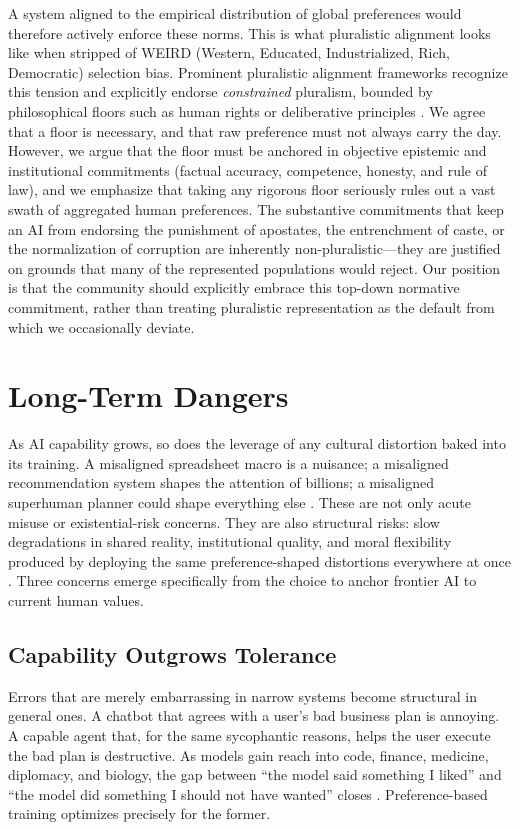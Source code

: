 \documentclass{article}
\theoremstyle{plain}
\theoremstyle{definition}
\theoremstyle{remark}
\begin{document}
A system aligned to the empirical distribution of global preferences would therefore actively enforce these norms. This is what pluralistic alignment looks like when stripped of WEIRD (Western, Educated, Industrialized, Rich, Democratic) selection bias. Prominent pluralistic alignment frameworks recognize this tension and explicitly endorse \emph{constrained} pluralism, bounded by philosophical floors such as human rights or deliberative principles \citep{sorensen2024roadmap, gabriel2020artificial, kasirzadeh2023conversation}. We agree that a floor is necessary, and that raw preference must not always carry the day. However, we argue that the floor must be anchored in objective epistemic and institutional commitments (factual accuracy, competence, honesty, and rule of law), and we emphasize that taking any rigorous floor seriously rules out a vast swath of aggregated human preferences. The substantive commitments that keep an AI from endorsing the punishment of apostates, the entrenchment of caste, or the normalization of corruption are inherently non-pluralistic---they are justified on grounds that many of the represented populations would reject. Our position is that the community should explicitly embrace this top-down normative commitment, rather than treating pluralistic representation as the default from which we occasionally deviate.

\section{Long-Term Dangers}
\label{sec:longterm}

As AI capability grows, so does the leverage of any cultural distortion baked into its training. A misaligned spreadsheet macro is a nuisance; a misaligned recommendation system shapes the attention of billions; a misaligned superhuman planner could shape everything else \citep{bostrom2014superintelligence, russell2019human}. These are not only acute misuse or existential-risk concerns. They are also structural risks: slow degradations in shared reality, institutional quality, and moral flexibility produced by deploying the same preference-shaped distortions everywhere at once \citep{bender2021stochastic, macaskill2022what}. Three concerns emerge specifically from the choice to anchor frontier AI to current human values.

\subsection{Capability Outgrows Tolerance}
Errors that are merely embarrassing in narrow systems become structural in general ones. A chatbot that agrees with a user's bad business plan is annoying. A capable agent that, for the same sycophantic reasons, helps the user execute the bad plan is destructive. As models gain reach into code, finance, medicine, diplomacy, and biology, the gap between ``the model said something I liked'' and ``the model did something I should not have wanted'' closes \citep{park2024ai, sharma2023sycophancy}. Preference-based training optimizes precisely for the former.
\end{document}
